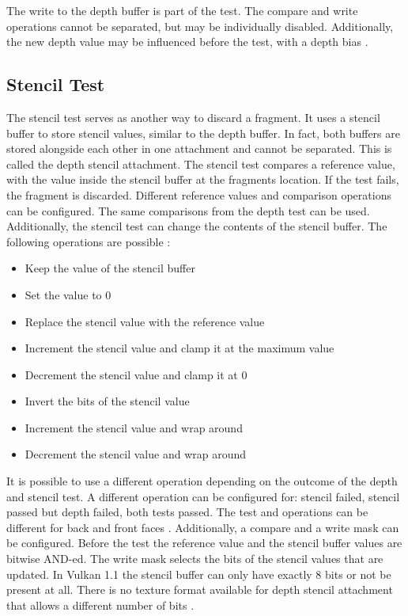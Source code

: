 The write to the depth buffer is part of the test. The compare and write operations cannot be separated, but may be individually disabled. Additionally, the new depth value may be influenced before the test, with a depth bias \cite{sellers:vulkanprogramming}.

\subsection{Stencil Test}
\label{section:stenciltest}

The stencil test serves as another way to discard a fragment. It uses a stencil buffer to store stencil values, similar to the depth buffer. In fact, both buffers are stored alongside each other in one attachment and cannot be separated. This is called the depth stencil attachment. The stencil test compares a reference value, with the value inside the stencil buffer at the fragments location. If the test fails, the fragment is discarded. Different reference values and comparison operations can be configured. The same comparisons from the depth test can be used. Additionally, the stencil test can change the contents of the stencil buffer. The following operations are possible \cite{sellers:vulkanprogramming}:
\begin{itemize}
	\item Keep the value of the stencil buffer
	\item Set the value to 0
	\item Replace the stencil value with the reference value
	\item Increment the stencil value and clamp it at the maximum value
	\item Decrement the stencil value and clamp it at 0
	\item Invert the bits of the stencil value
	\item Increment the stencil value and wrap around
	\item Decrement the stencil value and wrap around	
\end{itemize}

It is possible to use a different operation depending on the outcome of the depth and stencil test. A different operation can be configured for: stencil failed, stencil passed but depth failed, both tests passed. The test and operations can be different for back and front faces \cite{sellers:vulkanprogramming}. Additionally, a compare and a write mask can be configured. Before the test the reference value and the stencil buffer values are bitwise AND-ed. The write mask selects the bits of the stencil values that are updated. In Vulkan 1.1 the stencil buffer can only have exactly 8 bits or not be present at all. There is no texture format available for depth stencil attachment that allows a different number of bits \cite{khronos:vulkan:spec1.1}.

